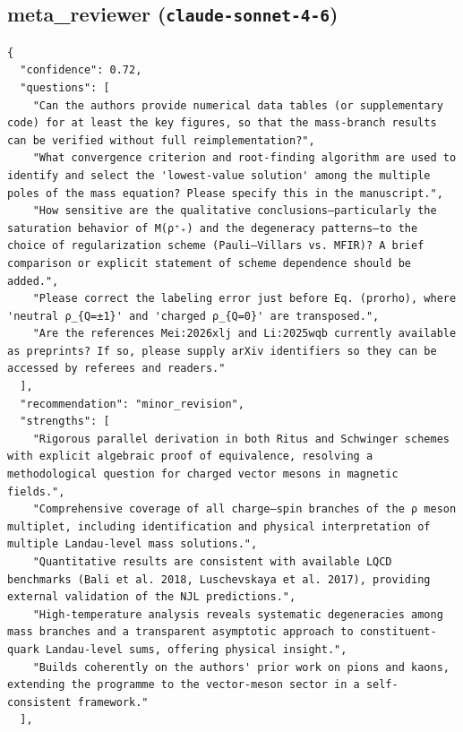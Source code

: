 \documentclass[11pt]{article}
\begin{document}
\subsection*{meta_reviewer (\texttt{claude-sonnet-4-6})}
\begin{verbatim}
{
  "confidence": 0.72,
  "questions": [
    "Can the authors provide numerical data tables (or supplementary code) for at least the key figures, so that the mass-branch results can be verified without full reimplementation?",
    "What convergence criterion and root-finding algorithm are used to identify and select the 'lowest-value solution' among the multiple poles of the mass equation? Please specify this in the manuscript.",
    "How sensitive are the qualitative conclusions—particularly the saturation behavior of M(ρ⁺₊) and the degeneracy patterns—to the choice of regularization scheme (Pauli–Villars vs. MFIR)? A brief comparison or explicit statement of scheme dependence should be added.",
    "Please correct the labeling error just before Eq. (prorho), where 'neutral ρ_{Q=±1}' and 'charged ρ_{Q=0}' are transposed.",
    "Are the references Mei:2026xlj and Li:2025wqb currently available as preprints? If so, please supply arXiv identifiers so they can be accessed by referees and readers."
  ],
  "recommendation": "minor_revision",
  "strengths": [
    "Rigorous parallel derivation in both Ritus and Schwinger schemes with explicit algebraic proof of equivalence, resolving a methodological question for charged vector mesons in magnetic fields.",
    "Comprehensive coverage of all charge–spin branches of the ρ meson multiplet, including identification and physical interpretation of multiple Landau-level mass solutions.",
    "Quantitative results are consistent with available LQCD benchmarks (Bali et al. 2018, Luschevskaya et al. 2017), providing external validation of the NJL predictions.",
    "High-temperature analysis reveals systematic degeneracies among mass branches and a transparent asymptotic approach to constituent-quark Landau-level sums, offering physical insight.",
    "Builds coherently on the authors' prior work on pions and kaons, extending the programme to the vector-meson sector in a self-consistent framework."
  ],

\end{verbatim}
\end{document}
